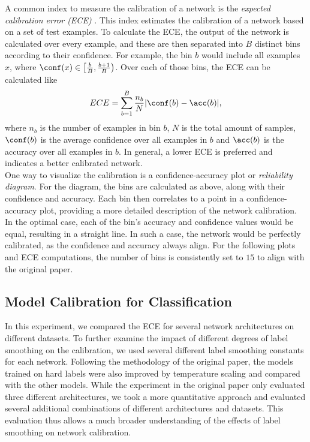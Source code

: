 A common index to measure the calibration of a network is the \textit{expected calibration error (ECE)} \cite{Naeini2015}. This index estimates the calibration of a network based on a set of test examples. To calculate the ECE, the output of the network is calculated over every example, and these are then separated into $B$ distinct bins according to their confidence. For example, the bin $b$ would include all examples $x$, where $\conf(x) \in \left\lbrack\frac{b}{B}, \frac{b+1}{B}\right)$. Over each of those bins, the ECE can be calculated like
$$ECE = \sum_{b=1}^B \frac{n_b}{N} |\conf(b)-\acc(b)|,$$
where $n_b$ is the number of examples in bin $b$, $N$ is the total amount of samples, $\conf(b)$ is the average confidence over all examples in $b$ and $\acc(b)$ is the accuracy over all examples in $b$. In general, a lower ECE is preferred and indicates a better calibrated network.\\

One way to visualize the calibration is a confidence-accuracy plot or \textit{reliability diagram}. For the diagram, the bins are calculated as above, along with their confidence and accuracy. Each bin then correlates to a point in a confidence-accuracy plot, providing a more detailed description of the network calibration. In the optimal case, each of the bin's accuracy and confidence values would be equal, resulting in a straight line. In such a case, the network would be perfectly calibrated, as the confidence and accuracy always align. For the following plots and ECE computations, the number of bins is consistently set to $15$ to align with the original paper.

\subsection{Model Calibration for Classification}

In this experiment, we compared the ECE for several network architectures on different datasets. To further examine the impact of different degrees of label smoothing on the calibration, we used several different label smoothing constants for each network. Following the methodology of the original paper, the models trained on hard labels were also improved by temperature scaling and compared with the other models. While the experiment in the original paper only evaluated three different architectures, we took a more quantitative approach and evaluated several additional combinations of different architectures and datasets. This evaluation thus allows a much broader understanding of the effects of label smoothing on network calibration.



